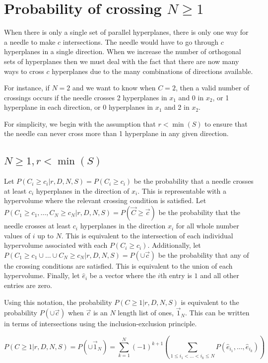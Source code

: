 \documentclass{article}
\begin{document}
\section{Probability of crossing $N\ge 1$}
When there is only a single set of parallel hyperplanes, there is only one way for a needle to make
$c$ intersections. The needle would have to go through $c$ hyperplanes in a single direction.
When we increase the number of orthogonal sets of hyperplanes then we must deal with the fact that
there are now many ways to cross $c$ hyperplanes due to the many combinations of directions available.

For instance, if $N=2$ and we want to know when $C=2$, then a valid number of crossings occurs if the
needle crosses 2 hyperplanes in $x_1$ and 0 in $x_2$, or 1 hyperplane in each direction, or 0 hyperplanes
in $x_1$ and 2 in $x_2$.

For simplicity, we begin with the assumption that $r<\min(S)$ to ensure that the needle can never cross
more than 1 hyperplane in any given direction.

\subsection{$N\ge 1, r<\min(S)$}
Let $P(C_i\ge c_i|r,D,N,S)=P(C_i\ge c_i)$ be the probability that a needle crosses at least $c_i$ hyperplanes in the direction of
$x_i$. This is representable with a hypervolume where the relevant crossing condition is satisfied.
Let $P(C_1\ge c_1 , \hdots , C_N\ge c_N|r,D,N,S)=P(\vec{C}\ge \vec{c})$ be the probability that the needle crosses at
least $c_i$ hyperplanes in the direction $x_i$ for all whole number values of $i$ up to $N$. This is equivalent
to the intersection of each individual hypervolume associated with each $P(C_i\ge c_i)$. Additionally,
let $P(C_1\ge c_1 \cup \hdots \cup C_N\ge c_N|r,D,N,S)=P(\cup\vec{c})$ be the probability that any of the
crossing conditions are satisfied. This is equivalent to the union of each hypervolume. Finally, let $\hat e_i$
be a vector where the $i$th entry is $1$ and all other entries are zero.

Using this notation, the probability $P(C\ge 1|r, D, N, S)$ is equivalent to the probability $P(\cup\vec{c})$
when $\vec{c}$ is an $N$ length list of ones, $\vec{1}_N$. This can be written in terms of intersections using
the inclusion-exclusion principle.

\begin{equation}
	P(C\ge 1|r, D, N, S) = P(\cup\vec{1}_N) = \sum_{k=1}^N (-1)^{k+1}\left(\sum_{1\le i_1 < \hdots < i_k \le N}P(\hat{e}_{i_1}, \hdots, \hat{e}_{i_k})\right)
\end{equation}
\end{document}
